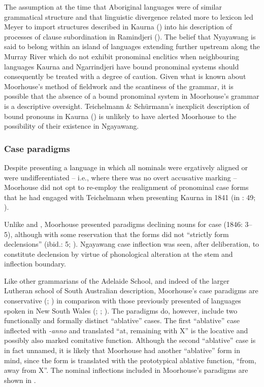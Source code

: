 The assumption at the time that Aboriginal languages were of similar grammatical structure and that linguistic divergence related more to lexicon led Meyer to import structures described in Kaurna (\citealt{teichelmann_outlines_1840}) into his description of processes of clause subordination in Ramindjeri (). The belief that Nyayawang is said to belong within an island of languages extending further upstream along the Murray River which do not exhibit pronominal enclitics \citep[340]{dixon_australian_2002} when neighbouring languages Kaurna and Ngarrindjeri have bound pronominal systems should consequently be treated with a degree of caution. Given what is known about Moorhouse’s method of fieldwork and the scantiness of the grammar, it is possible that the absence of a bound pronominal system in Moorhouse’s grammar is a descriptive oversight. Teichelmann \& Schürmann’s inexplicit description of bound pronouns in Kaurna () is unlikely to have alerted Moorhouse to the possibility of their existence in Ngayawang.

\subsubsection{Case paradigms}
\label{sec:key:6.4.1.3}

Despite presenting a language in which all nominals were ergatively aligned or were undifferentiated -- i.e., where there was no overt accusative marking -- Moorhouse did not opt to re-employ the realignment of pronominal case forms that he had engaged with Teichelmann when presenting Kaurna in 1841 (in \citealt{foster_two_1990}: 49; ).

 Unlike \citet{meyer_vocabulary_1843} and \citet{schurmann_letter_1844}, Moorhouse presented paradigms declining nouns for case (1846: 3--5), although with some reservation that the forms did not “strictly form declensions” (ibid.: 5; ). Ngayawang case inflection was seen, after deliberation, to constitute declension by virtue of phonological alteration at the stem and inflection boundary.

Like other grammarians of the Adelaide School, and indeed of the larger Lutheran school of South Australian description, Moorhouse’s case paradigms are conservative (; ) in comparison with those previously presented of languages spoken in New South Wales (\citealt{threlkeld_australian_1834}; \citealt{gunther_native_1838}; \citeyear{gunther_lecture_1840}). The paradigms do, however, include two functionally and formally distinct “ablative” cases. The first “ablative” case inflected with \textit{-anno} and translated “at, remaining with X” is the locative \citep[95]{horgen_languages_2004} and possibly also marked comitative function. Although the second “ablative” case is in fact unnamed, it is likely that Moorhouse had another “ablative” form in mind, since the form is translated with the prototypical ablative function, “from, away from X”. The nominal inflections included in Moorhouse’s paradigms are shown in .


